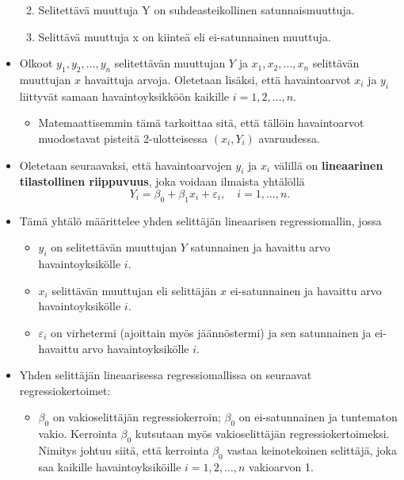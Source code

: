 \documentclass[
]{book}
\providecommand{\tightlist}{%
  \setlength{\itemsep}{0pt}\setlength{\parskip}{0pt}}
\begin{document}
\begin{itemize}
  \begin{enumerate}
  \def\labelenumi{\roman{enumi})}
  \tightlist
  \item
    Selitettävä muuttuja Y on suhdeasteikollinen satunnaismuuttuja.
  \item
    Selittävä muuttuja x on kiinteä eli ei-satunnainen muuttuja.
  \end{enumerate}
\item
  Olkoot \(y_1, y_2,\ldots, y_n\) selitettävän muuttujan \(Y\) ja \(x_1, x_2, \ldots, x_n\) selittävän muuttujan \(x\) havaittuja arvoja. Oletetaan lisäksi, että havaintoarvot \(x_i\) ja \(y_i\) liittyvät
  samaan havaintoyksikköön kaikille \(i=1, 2, \ldots, n\).

  \begin{itemize}
  \tightlist
  \item
    Matemaattisemmin tämä tarkoittaa sitä, että tällöin havaintoarvot muodostavat pisteitä 2-ulotteisessa \((x_i, Y_i)\) avaruudessa.
  \end{itemize}
\item
  Oletetaan seuraavaksi, että havaintoarvojen \(y_i\) ja \(x_i\) välillä on \textbf{lineaarinen tilastollinen riippuvuus}, joka voidaan ilmaista yhtälöllä
  \[
  Y_i = \beta_0 + \beta_1 x_i + \varepsilon_i, \quad i=1,\ldots, n.
  \]
\item
  Tämä yhtälö määrittelee yhden selittäjän lineaarisen regressiomallin, jossa

  \begin{itemize}
  \tightlist
  \item
    \(y_i\) on selitettävän muuttujan \(Y\) satunnainen ja havaittu arvo havaintoyksikölle \(i\).
  \item
    \(x_i\) selittävän muuttujan eli selittäjän \(x\) ei-satunnainen ja havaittu arvo havaintoyksikölle \(i\).
  \item
    \(\varepsilon_i\) on virhetermi (ajoittain myös jäännöstermi) ja sen satunnainen ja ei-havaittu arvo havaintoyksikölle \(i\).
  \end{itemize}
\item
  Yhden selittäjän lineaarisessa regressiomallissa on seuraavat regressiokertoimet:

  \begin{itemize}
  \tightlist
  \item
    \(\beta_0\) on vakioselittäjän regressiokerroin; \(\beta_0\) on ei-satunnainen ja tuntematon vakio. Kerrointa \(\beta_0\) kutsutaan myös vakioselittäjän regressiokertoimeksi. Nimitys johtuu siitä, että kerrointa \(\beta_0\) vastaa keinotekoinen selittäjä, joka saa kaikille havaintoyksiköille \(i=1, 2, \ldots, n\) vakioarvon 1.


\end{itemize}
\end{itemize}
\end{document}
